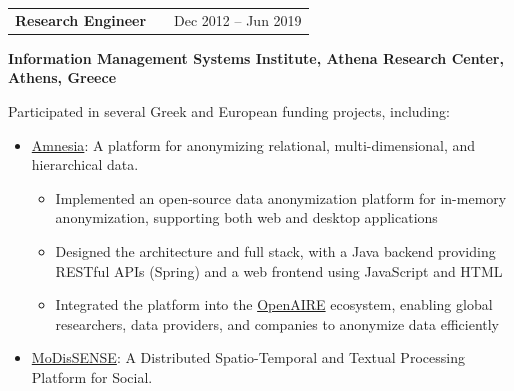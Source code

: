 \documentclass[a4paper,10pt]{article}
\makeatletter
\newenvironment{job}[2]
{
	\begin{tabularx}{\linewidth}{@{}l X r@{}}
		\small
		\textbf{#1} & \hfill &  #2 \\[3.75pt]
	\end{tabularx}
	\footnotesize
	\setlength{\parskip}{3pt} %
	\setlength{\parindent}{0pt} %
}
{
}
\makeatother
\begin{document}
\begin{job}{Research Engineer}{Dec 2012 – Jun 2019}
	\textbf{Information Management Systems Institute, Athena Research Center, Athens, Greece} 
	
		
	Participated in several Greek and European funding projects, including:
	
	\begin{itemize}
		
		\item \href{https://amnesia.openaire.eu/}{Amnesia}: A platform for anonymizing relational, multi-dimensional, and hierarchical data. 
		
		\begin{itemize}
			
			\item Implemented an open-source data anonymization platform for in-memory anonymization, supporting both web and desktop applications
			
			\item Designed the architecture and full stack, with a Java backend providing RESTful APIs (Spring) and a web frontend using JavaScript and HTML
			
			\item Integrated the platform into the  \href{https://www.openaire.eu/}{OpenAIRE} ecosystem, enabling global researchers, data providers, and companies to anonymize data efficiently
			
			
			
		\end{itemize}
		
		\vspace{-1\baselineskip}
		
		\item \href{http://www.modissense.gr/}{MoDisSENSE}: A Distributed Spatio-Temporal and Textual Processing Platform for Social. 
		
		\begin{itemize}
			

\end{itemize}
\end{itemize}
\end{job}
\end{document}
